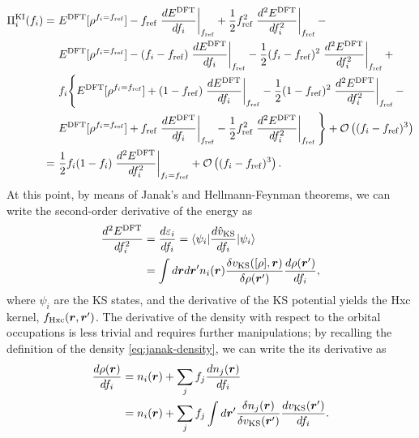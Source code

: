 \begin{equation}
    \begin{split}
    \Pi_i^{\rm KI}(f_i) =\
    &E^{\rm DFT}[\rho^{f_i=f_{\rm ref}}] - f_{\rm ref} \left. \frac{dE^{\rm DFT}}{df_i} \right|_{f_{\rm ref}} + \frac{1}{2} f_{\rm ref}^2 \left. \frac{d^2 E^{\rm DFT}}{df_i^2} \right|_{f_{\rm ref}} - \\
    &E^{\rm DFT}[\rho^{f_i=f_{\rm ref}}] - (f_i - f_{\rm ref}) \left. \frac{dE^{\rm DFT}}{df_i} \right|_{f_{\rm ref}} - \frac{1}{2} (f_i - f_{\rm ref})^2 \left. \frac{d^2 E^{\rm DFT}}{df_i^2} \right|_{f_{\rm ref}} + \\
    &f_i \Bigg\{ E^{\rm DFT}[\rho^{f_i=f_{\rm ref}}] + (1 - f_{\rm ref}) \left. \frac{dE^{\rm DFT}}{df_i} \right|_{f_{\rm ref}} - \frac{1}{2} (1 - f_{\rm ref})^2 \left. \frac{d^2 E^{\rm DFT}}{df_i^2} \right|_{f_{\rm ref}} - \\
    &E^{\rm DFT}[\rho^{f_i=f_{\rm ref}}] + f_{\rm ref} \left. \frac{dE^{\rm DFT}}{df_i} \right|_{f_{\rm ref}} - \frac{1}{2} f_{\rm ref}^2 \left. \frac{d^2 E^{\rm DFT}}{df_i^2} \right|_{f_{\rm ref}} \Bigg\} + \mathcal{O}\left( (f_i - f_{\rm ref})^3 \right) \\
    =\ &\frac{1}{2} f_i(1-f_i) \left. \frac{d^2 E^{\rm DFT}}{df_i^2} \right|_{f_i=f_{\rm ref}} + \mathcal{O}\left( (f_i - f_{\rm ref})^3 \right) .
    \end{split}
    \label{eq:ki-correction-second-order}
\end{equation}
%
At this point, by means of Janak's and Hellmann-Feynman theorems, we can write the second-order derivative of the energy as
%
\begin{equation}
    \begin{split}
    \frac{d^2 E^{\rm DFT}}{df_i^2} &= \frac{d\varepsilon_i}{df_i} = \braket{\psi_i|\frac{d\hat{v}_{\rm KS}}{df_i}|\psi_i} \\
    &= \int d{\bm r} d{\bm r}' n_i({\bm r}) \frac{\delta v_{\rm KS}([\rho],{\bm r})}{\delta\rho({\bm r}')} \frac{d\rho({\bm r}')}{df_i} ,
    \end{split}
    \label{eq:second-derivative-energy}
\end{equation}
%
where $\psi_i$ are the KS states, and the derivative of the KS potential yields the Hxc kernel, $f_{\rm Hxc}({\bm r},{\bm r}')$. The derivative of the density with respect to the orbital occupations is less trivial and requires further manipulations; by recalling the definition of the density \eqref{eq:janak-density}, we can write the its derivative as
%
\begin{equation}
    \begin{split}
    \frac{d\rho({\bm r})}{df_i} &= n_i({\bm r}) + \sum_j f_j \frac{dn_j({\bm r})}{df_i} \\
    &= n_i({\bm r}) + \sum_j f_j \int d{\bm r}' \frac{\delta n_j({\bm r})}{\delta v_{\rm KS}({\bm r}')} \frac{dv_{\rm KS}({\bm r}')}{df_i} .
    \end{split}
    \label{eq:density-derivative-1}
\end{equation}

